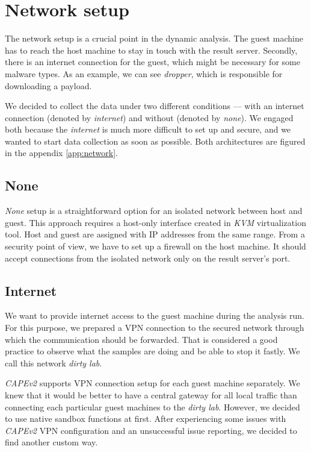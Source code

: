 \section{Network setup}
The network setup is a crucial point in the dynamic analysis. The guest machine has to reach the host machine to stay in touch with the result server. Secondly, there is an internet connection for the guest, which might be necessary for some malware types. As an example, we can see \emph{dropper}, which is responsible for downloading a payload.

We decided to collect the data under two different conditions --- with an internet connection (denoted by \emph{internet}) and without (denoted by \emph{none}). We engaged both because the \emph{internet} is much more difficult to set up and secure, and we wanted to start data collection as soon as possible. Both architectures are figured in the appendix \ref{app:network}.

\subsection{None}
\emph{None} setup is a straightforward option for an isolated network between host and guest. This approach requires a host-only interface created in \emph{KVM} virtualization tool. Host and guest are assigned with IP addresses from the same range. From a security point of view, we have to set up a firewall on the host machine. It should accept connections from the isolated network only on the result server's port.

\subsection{Internet}
We want to provide internet access to the guest machine during the analysis run. For this purpose, we prepared a VPN connection to the secured network through which the communication should be forwarded. That is considered a good practice to observe what the samples are doing and be able to stop it fastly. We call this network \emph{dirty lab}.

\emph{CAPEv2} supports VPN connection setup for each guest machine separately. We knew that it would be better to have a central gateway for all local traffic than connecting each particular guest machines to the \emph{dirty lab}. However, we decided to use native sandbox functions at first. After experiencing some issues with \emph{CAPEv2} VPN configuration and an unsuccessful issue reporting, we decided to find another custom way. 

